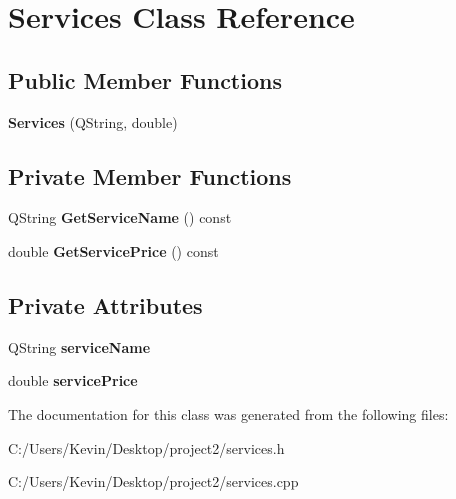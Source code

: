 \hypertarget{class_services}{}\section{Services Class Reference}
\label{class_services}
\subsection*{Public Member Functions}
\begin{DoxyCompactItemize}
\item 
\mbox{\label{class_services_af3f011adec7bb879dbe2edd7d82c3189}} 
{\bfseries Services} (Q\+String, double)
\end{DoxyCompactItemize}
\subsection*{Private Member Functions}
\begin{DoxyCompactItemize}
\item 
\mbox{\label{class_services_a476c9430a7e8044dae0739fa03455ddf}} 
Q\+String {\bfseries Get\+Service\+Name} () const
\item 
\mbox{\label{class_services_abf121ad4db9cb94ba08ff9b41f4dd157}} 
double {\bfseries Get\+Service\+Price} () const
\end{DoxyCompactItemize}
\subsection*{Private Attributes}
\begin{DoxyCompactItemize}
\item 
\mbox{\label{class_services_a90859ac5045d814453788e8ba0cc8a8f}} 
Q\+String {\bfseries service\+Name}
\item 
\mbox{\label{class_services_a932354157658967bd6e67053cf1fadbe}} 
double {\bfseries service\+Price}
\end{DoxyCompactItemize}


The documentation for this class was generated from the following files\+:\begin{DoxyCompactItemize}
\item 
C\+:/\+Users/\+Kevin/\+Desktop/project2/services.\+h\item 
C\+:/\+Users/\+Kevin/\+Desktop/project2/services.\+cpp\end{DoxyCompactItemize}
